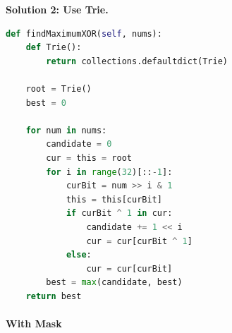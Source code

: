 \documentclass[../main.tex]{subfiles}
\begin{document}
\begin{examples}[resume]
\textbf{Solution 2: Use Trie.} 
\begin{lstlisting}[language=Python]
def findMaximumXOR(self, nums):
    def Trie(): 
        return collections.defaultdict(Trie)
    
    root = Trie()
    best = 0
    
    for num in nums:
        candidate = 0
        cur = this = root
        for i in range(32)[::-1]:
            curBit = num >> i & 1
            this = this[curBit]
            if curBit ^ 1 in cur:
                candidate += 1 << i
                cur = cur[curBit ^ 1]
            else:
                cur = cur[curBit]
        best = max(candidate, best)
    return best
\end{lstlisting}
\end{examples}
\paragraph{With Mask}
\end{document}
